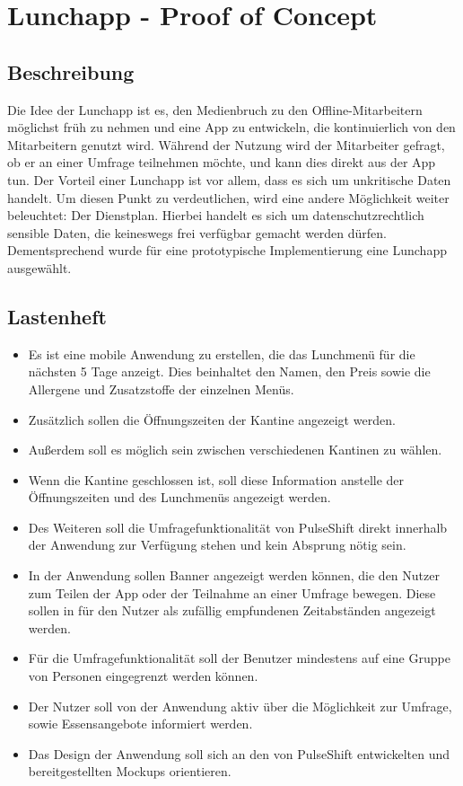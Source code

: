 \section{Lunchapp - Proof of Concept}
\label{section:realisation:lunchapp}

\subsection{Beschreibung}
Die Idee der Lunchapp ist es, den Medienbruch zu den Offline-Mitarbeitern möglichst früh zu nehmen und eine App zu entwickeln, die kontinuierlich von den Mitarbeitern genutzt wird. Während der Nutzung wird der Mitarbeiter gefragt, ob er an einer Umfrage teilnehmen möchte, und kann dies direkt aus der App tun. Der Vorteil einer Lunchapp ist vor allem, dass es sich um unkritische Daten handelt. Um diesen Punkt zu verdeutlichen, wird eine andere Möglichkeit weiter beleuchtet: Der Dienstplan. Hierbei handelt es sich um datenschutzrechtlich sensible Daten, die keineswegs frei verfügbar gemacht werden dürfen. Dementsprechend wurde für eine prototypische Implementierung eine Lunchapp ausgewählt.
\subsection{Lastenheft}

\begin{itemize}
\item Es ist eine mobile Anwendung zu erstellen, die das Lunchmenü für die nächsten 5 Tage anzeigt. Dies beinhaltet den Namen, den Preis sowie die Allergene und Zusatzstoffe der einzelnen Menüs.
\item Zusätzlich sollen die Öffnungszeiten der Kantine angezeigt werden. 
\item Außerdem soll es möglich sein zwischen verschiedenen Kantinen zu wählen.
\item Wenn die Kantine geschlossen ist, soll diese Information anstelle der Öffnungszeiten und des Lunchmenüs angezeigt werden.
\item Des Weiteren soll die Umfragefunktionalität von PulseShift direkt innerhalb der Anwendung zur Verfügung stehen und kein Absprung nötig sein.
\item In der Anwendung sollen Banner angezeigt werden können, die den Nutzer zum Teilen der App oder der Teilnahme an einer Umfrage bewegen. Diese sollen in für den Nutzer als zufällig empfundenen Zeitabständen angezeigt werden.
\item Für die Umfragefunktionalität soll der Benutzer mindestens auf eine Gruppe von Personen eingegrenzt werden können.
\item Der Nutzer soll von der Anwendung aktiv über die Möglichkeit zur Umfrage, sowie Essensangebote informiert werden.
\item Das Design der Anwendung soll sich an den von PulseShift entwickelten und bereitgestellten Mockups orientieren.
\end{itemize}

